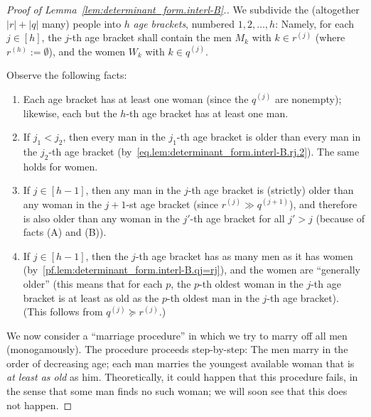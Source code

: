 \documentclass[reqno]{amsart}
\newcommand{\0}{\phantom{c}}
\newcommand{\abs}[1]{\left| #1 \right|}
\newcommand{\ive}[1]{\left[ #1 \right]}
\newcommand{\defn}[1]{{\color{darkred}\emph{#1}}} %
\theoremstyle{plain}
\theoremstyle{definition}
\numberwithin{equation}{section}
\begin{document}
\begin{proof}[Proof of Lemma~\ref{lem:determinant_form.interl-B}.]
We subdivide the (altogether $\abs{r} + \abs{q}$ many) people into $h$ \defn{age brackets}, numbered $1, 2, \ldots, h$:
Namely, for each $j \in \ive{h}$, the $j$-th age bracket shall contain
 the men $M_k$ with $k \in r^{(j)}$ (where $r^{(h)} := \emptyset$), and
 the women $W_k$ with $k \in q^{(j)}$.

Observe the following facts:
\begin{enumerate}
\item[(A)] Each age bracket has at least one woman (since the $q^{(j)}$ are nonempty); likewise, each but the $h$-th age bracket has at least one man.
\item[(B)] If $j_1 < j_2$, then every man in the $j_1$-th age bracket is older than every man in the $j_2$-th age bracket (by~\eqref{eq.lem:determinant_form.interl-B.rj.2}). The same holds for women.
\item[(C)] If $j \in \ive{h-1}$, then any man in the $j$-th age bracket is (strictly) older than any woman in the $j+1$-st age bracket (since $r^{(j)} \gg q^{(j+1)}$), and therefore is also older than any woman in the $j'$-th age bracket for all $j' > j$ (because of facts (A) and (B)).
\item[(D)] If $j \in \ive{h-1}$, then the $j$-th age bracket has as many men as it has women (by~\eqref{pf.lem:determinant_form.interl-B.qj=rj}), and the women are ``generally older'' (this means that for each $p$, the $p$-th oldest woman in the $j$-th age bracket is at least as old as the $p$-th oldest man in the $j$-th age bracket). (This follows from $q^{(j)} \succeq r^{(j)}$.)
\end{enumerate}

We now consider a ``marriage procedure'' in which we try to marry off all men (monogamously).
The procedure proceeds step-by-step:
The men marry in the order of decreasing age; each man marries the youngest available woman that is \emph{at least as old} as him.
Theoretically, it could happen that this procedure fails, in the sense that some man finds no such woman; we will soon see that this does not happen.


\end{proof}
\end{document}

